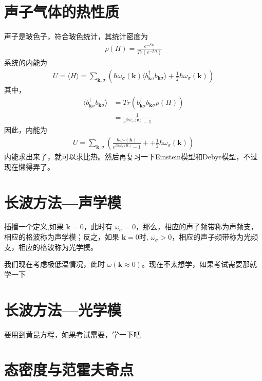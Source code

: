 \section{声子气体的热性质}
声子是玻色子，符合玻色统计，其统计密度为
\begin{equation}
    \begin{aligned} 
    \rho (H) = \frac{e^{-\beta H }}{ Tr (e^{-\beta H})}
    \end{aligned} 
\end{equation}
系统的内能为
\begin{equation}
    \begin{aligned} 
    U = \langle H \rangle = \sum_{\mathbf{k},\sigma}( \hbar \omega_\sigma (\mathbf{k} )\langle b^\dagger_{\mathbf{k}\sigma }b_{\mathbf{k}\sigma }\rangle +\frac{1}{2} \hbar \omega_\sigma (\mathbf{k} ))
    \end{aligned} 
\end{equation}
其中，
\begin{equation}
    \begin{aligned} 
        \langle b^\dagger_{\mathbf{k}\sigma }b_{\mathbf{k}\sigma }\rangle &=  Tr(b^\dagger_{\mathbf{k}\sigma }b_{\mathbf{k}\sigma } \rho(H)) \\
        &= \frac{1}{e^{\beta \hbar \omega_\sigma (\mathbf{k} )}-1}
    \end{aligned} 
\end{equation}
因此，内能为
\begin{equation}
    \begin{aligned} 
    U = \sum_{\mathbf{k},\sigma} \left( \frac{\hbar \omega_\sigma(\mathbf{k} )}{e^{\beta \hbar \omega_\sigma (\mathbf{k} )}-1}
    +  +\frac{1}{2} \hbar \omega_\sigma (\mathbf{k} ) \right)
    \end{aligned} 
\end{equation}
内能求出来了，就可以求比热。然后再复习一下Einstein模型和Debye模型，不过现在懒得弄了。
\section{长波方法---声学模}
\par 插播一个定义,如果 $\mathbf{k}= 0$，此时有
$\omega_\sigma = 0$，那么，相应的声子频带称为声频支，相应的格波称为声学模；反之，如果 $\mathbf{k}= 0$时,
$\omega_\sigma > 0$，相应的声子频带称为光频支，相应的格波称为光学模。
\par 我们现在考虑极低温情况，此时 $\omega (\mathbf{k}  \approx 0)$。现在不太想学，如果考试需要那就学一下
\section{长波方法---光学模}
要用到黄昆方程，如果考试需要，学一下吧
\section{态密度与范霍夫奇点}